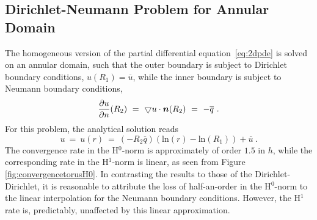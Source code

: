 \documentclass[12pt,twoside]{article}
\newcommand{\mb}[1]{{\mbox{\boldmath$#1$\unboldmath}}}
\begin{document}
\subsection{Dirichlet-Neumann Problem for Annular Domain}
\par
The homogeneous version of the partial differential equation~\eqref{eq:2dpde} 
is solved on an annular domain, such that the outer boundary is subject 
to Dirichlet boundary conditions, $u(R_1) = \overline{u}$, while the inner 
boundary is subject to Neumann boundary conditions, 
%
\begin{equation}\label{eqn:neumbc} 
\frac{\partial u}{\partial n}(R_2)\ =\ 
\bigtriangledown u \cdot \mb{n}(R_2)\ =\ -\overline{q}\ .
\end{equation}
%
For this problem, the analytical solution reads
%
\begin{equation}
u\ =\ u(r)\ =\ (-R_2\overline{q})( \text{ln}(r)- \text{ln}(R_1))+\overline{u}\ .
\end{equation}
%
The convergence rate in the H$^0$-norm is approximately of order 
$1.5$ in $h$, while the corresponding rate in the H$^1$-norm 
is linear, as seen from Figure \ref{fig:convergencetorusH0}. In contrasting the results to those of
the Dirichlet-Dirichlet, it is reasonable to attribute the loss of 
half-an-order in the H$^0$-norm to the linear interpolation for 
the Neumann boundary conditions. However, the H$^1$ rate is,
predictably, unaffected by this linear approximation. 
\end{document}
